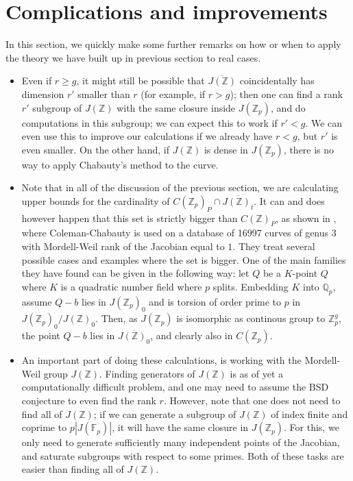 \documentclass[12pt]{article}
\newcommand{\Z}{\mathbb{Z}}
\newcommand{\Q}{\mathbb{Q}}
\newcommand{\F}{\mathbb{F}}
\theoremstyle{plain}
\theoremstyle{definition}
\theoremstyle{remark}
\begin{document}
\section{Complications and improvements}
\label{section:remarks} 
In this section, we quickly make some further remarks on how or when to apply the theory we have built up in previous section to real cases.
\begin{itemize} 
\item Even if $r \geq g$, it might still be possible that $\overline{J(\Z)}$ coincidentally has dimension $r'$ smaller than $r$ (for example, if $r > g$); then one can find a rank $r'$ subgroup of $J(\Z)$ with the same closure inside $J(\Z_p)$, and do computations in this subgroup; we can expect this to work if $r' < g$. We can even use this to improve our calculations if we already have $r < g$, but $r'$ is even smaller. On the other hand, if $J(\Z)$ is dense in $J(\Z_p)$, there is no way to apply Chabauty's method to the curve.
\item Note that in all of the discussion of the previous section, we are calculating upper bounds for the cardinality of $C(\Z_p)_P \cap \overline{J(\Z)_t}$. It can and does however happen that this set is strictly bigger than $C(\Z)_P$, as shown in \cite{Balakrishnan19}, where Coleman-Chabauty is used on a database of 16997 curves of genus $3$ with Mordell-Weil rank of the Jacobian equal to $1$. They treat several possible cases and examples where the set is bigger. One of the main families they have found can be given in the following way: let $Q$ be a $K$-point $Q$ where $K$ is a quadratic number field where $p$ splits. Embedding $K$ into $\Q_p$, assume $Q-b$ lies in $J(\Z_p)_0$ and is torsion of order prime to $p$ in $J(\Z_p)_0/J(\Z)_0$. Then, as $J(\Z_p)$ is isomorphic as continous group to $\Z_p^g$, the point $Q-b$ lies in $\overline{J(\Z)_0}$, and clearly also in $C(\Z_p)$.
\item An important part of doing these calculations, is working with the Mordell-Weil group $J(\Z)$. Finding generators of $J(\Z)$ is as of yet a computationally difficult problem, and one may need to assume the BSD conjecture to even find the rank $r$. However, note that one does not need to find all of $J(\Z)$; if we can generate a subgroup of $J(\Z)$ of index finite and coprime to $p|J(\F_p)|$, it will have the same closure in $J(\Z_p)$. For this, we only need to generate sufficiently many independent points of the Jacobian, and saturate subgroups with respect to some primes. Both of these tasks are easier than finding all of $J(\Z)$.

\end{itemize}
\end{document}
